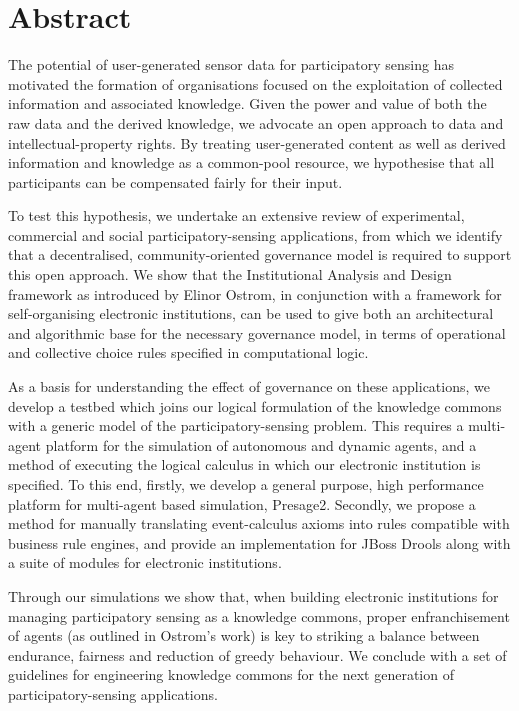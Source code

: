 \begingroup
\let\clearpage\relax
\let\cleardoublepage\relax
\let\cleardoublepage\relax

\chapter*{Abstract}

The potential of user-generated sensor data for participatory sensing has motivated the formation of organisations focused on the exploitation of collected information and associated knowledge. 
Given the power and value of both the raw data and the derived knowledge, we advocate an open approach to data and intellectual-property rights. By treating user-generated content as well as derived information and knowledge 
as a common-pool resource, we hypothesise that
all participants can be compensated fairly for their input.

To test this hypothesis, we undertake an extensive review of experimental, commercial and social participatory-sensing applications, from which we identify that a decentralised, community-oriented governance model is required
to support this open approach. We show that the Institutional Analysis and Design framework as introduced by Elinor Ostrom, in conjunction
with a framework for self-organising electronic institutions, can be used to give both an architectural
and algorithmic base for the necessary governance model, in terms of operational and collective choice rules
specified in computational logic.

As a basis for understanding the effect of governance on these applications, we develop a testbed which joins our logical formulation of the knowledge commons with a generic model of the participatory-sensing problem.
This requires a multi-agent platform for the simulation of autonomous and dynamic agents, and a method of executing the logical calculus in which our electronic institution is specified. 
To this end, firstly, we develop a general purpose, high performance platform for multi-agent based simulation, Presage2. 
Secondly, we propose a method for manually translating event-calculus axioms into rules compatible with business rule engines, and provide an implementation for JBoss Drools along with a suite of modules for electronic institutions.

Through our simulations we show that, when building electronic institutions for managing participatory sensing as a knowledge commons, proper enfranchisement of agents (as outlined in Ostrom's work) is key to striking a balance between endurance, fairness and reduction of greedy behaviour. We conclude with a set of guidelines for engineering knowledge commons for the next generation of participatory-sensing applications.

